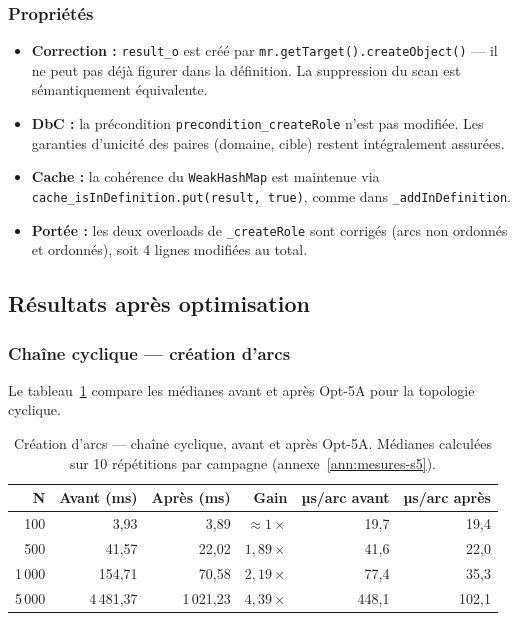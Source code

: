 \subsubsection{Propriétés}

\begin{itemize}
  \item \textbf{Correction :} \texttt{result\_o} est créé par \texttt{mr.getTarget().createObject()} — il ne peut pas déjà figurer dans la définition. La suppression du scan est sémantiquement équivalente.
  \item \textbf{DbC :} la précondition \texttt{precondition\_createRole} n'est pas modifiée. Les garanties d'unicité des paires (domaine, cible) restent intégralement assurées.
  \item \textbf{Cache :} la cohérence du \texttt{WeakHashMap} est maintenue via \texttt{cache\_isInDefinition.put(result, true)}, comme dans \texttt{\_addInDefinition}.
  \item \textbf{Portée :} les deux overloads de \texttt{\_createRole} sont corrigés (arcs non ordonnés et ordonnés), soit 4 lignes modifiées au total.
\end{itemize}

\subsection{Résultats après optimisation}

\subsubsection{Chaîne cyclique — création d'arcs}

Le tableau~\ref{tab:sc5-arc-cyclique-apres} compare les médianes
avant et après Opt-5A pour la topologie cyclique.

\begin{table}[h]
\centering
\caption{Création d'arcs --- chaîne cyclique, avant et après Opt-5A.
Médianes calculées sur 10 répétitions par campagne
(annexe~\ref{ann:mesures-s5}).}
\label{tab:sc5-arc-cyclique-apres}
\begin{tabular}{rrrrrr}
\hline
\textbf{N} & \textbf{Avant (ms)} & \textbf{Après (ms)} & \textbf{Gain}
           & \textbf{µs/arc avant} & \textbf{µs/arc après} \\
\hline
100    & 3,93       & 3,89      & $\approx 1\times$ & 19,7  & 19,4 \\
500    & 41,57      & 22,02     & $1{,}89\times$    & 41,6  & 22,0 \\
1\,000 & 154,71     & 70,58     & $2{,}19\times$    & 77,4  & 35,3 \\
5\,000 & 4\,481,37  & 1\,021,23 & $4{,}39\times$    & 448,1 & 102,1 \\
\hline
\end{tabular}
\end{table}

